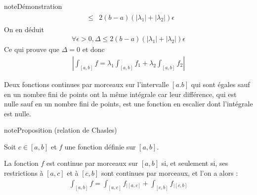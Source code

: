 \documentclass[letterpaper,10pt,french]{jupyterBook}
\begin{document}
\begin{sphinxadmonition}{note}{Démonstration}
\begin{equation*}
\begin{split}
\begin{aligned}
& \leq & 2(b-a)(|\lambda_1|+|\lambda_2|)\epsilon
\end{aligned}
\end{split}
\end{equation*}
\sphinxAtStartPar
On en déduit
\begin{equation*}
\begin{split}
\forall \epsilon >0, \Delta \leq 2(b-a)(|\lambda_1|+|\lambda_2|)\epsilon
\end{split}
\end{equation*}
\sphinxAtStartPar
Ce qui prouve que \(\Delta =0\) et donc
\begin{equation*}
\begin{split}
 \left|\int_{[a, b]} f = \lambda_1\int_{[a, b]} f_1 +\lambda_2\int_{[a, b]} f_2\right|
\end{split}
\end{equation*}\end{sphinxadmonition}

\sphinxAtStartPar
Deux fonctions continues par morceaux sur l’intervalle \([a. b]\)  qui sont égales sauf en un nombre fini de points ont la même intégrale car leur différence, qui est nulle sauf
en un nombre fini de points, est une fonction en escalier dont l’intégrale est nulle.

\begin{sphinxadmonition}{note}{Proposition (relation de Chasles)}

\sphinxAtStartPar
Soit \(c \in [a, b]\) et \(f\) une fonction définie sur \([a, b]\).

\sphinxAtStartPar
La fonction \(f\) est continue par morceaux sur \([a, b]\) si, et seulement si, ses
restrictions à \([a, c]\) et à \([c, b]\) sont continues par morceaux, et l’on a alors :
\begin{equation*}
\begin{split}
\int_{[a, b]} f = \int_{[a, c]} f_{|[a, c]}  + \int_{[c, b]} f_{|[c, b]}
\end{split}
\end{equation*}\end{sphinxadmonition}
\end{document}
